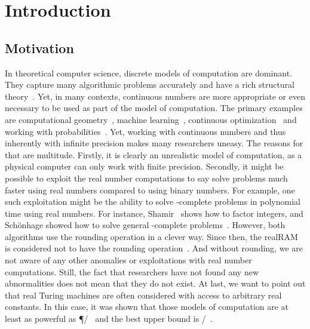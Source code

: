 \documentclass{article}
\begin{document}
\vfill

\begin{comment}
\paragraph{Acknowledgments.}
L.M. and T.M. are generously supported by the Netherlands Organisation for Scientific Research (NWO) under project  no. VI.Vidi.213.150. S.P. is co-funded by the European Union (ERC, ASC-Q, 101040624).
\end{comment}



\newpage

\tableofcontents

\newpage
\section{Introduction}
\subsection{Motivation}
    In theoretical computer science, discrete models of computation are dominant.
    They capture many algorithmic problems accurately and have a rich structural theory~\cite{arora2009computational}.
    Yet, in many contexts, continuous numbers are more appropriate or even necessary to be used as part of the model of computation.
    The primary examples are computational geometry~\cite{2017handbookDCG}, machine learning~\cite{alpaydin2020introduction}, continuous optimization~\cite{2020introductionContinuousOptimiziation} and working with probabilities~\cite{spielman2004smoothed}.
    Yet, working with continuous numbers and thus inherently with infinite precision makes many researchers uneasy.
    The reasons for that are multitude.
    Firstly, it is clearly an unrealistic model of computation, as a physical computer can only work with finite precision.
    Secondly, it might be possible to exploit the real number computations to say solve problems much faster
    using real numbers compared to using binary numbers.
    For example, one such exploitation might be the ability to solve \PSPACE-complete problems in polynomial time using real numbers.
    For instance, Shamir~\cite{shamir1977factoring} shows how to factor integers,
    and Sch\"{o}nhage showed how to solve general \PSPACE-complete problems~\cite{schonhage1979power}.
    However, both algorithms use the rounding operation in a clever way.
    Since then, the realRAM is considered not to have the rounding operation~\cite{EvdHM20}.
    And without rounding, we are not aware of any other anomalies or exploitations with real number computations. 
    Still, the fact that researchers have not found any new abnormalities does not mean that they do not exist.
    At last, we want to point out that real Turing machines are often considered with access to arbitrary real constants. 
    In this case, it was shown that those models of computation are at least as powerful as \P/\poly~\cite{Koiran94} and the best upper bound is 
    \PSPACE/\poly~\cite{CuckerGrigoriev1997}.
       
\end{document}
